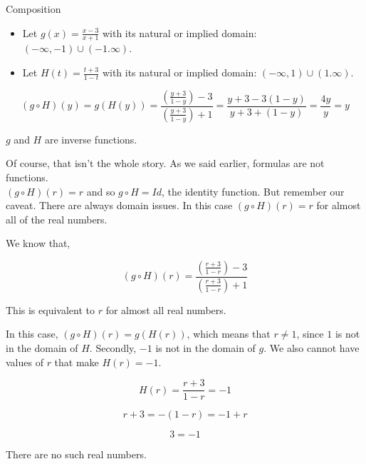 \documentclass{ximera}
\begin{document}
\begin{example} Composition



\begin{itemize}
\item Let $g(x) = \frac{x-3}{x+1}$ with its natural or implied domain: $(-\infty, -1) \cup (-1. \infty)$. \\

\item Let $H(t) = \frac{t+3}{1-t}$ with its natural or implied domain: $(-\infty, 1) \cup (1. \infty)$.
\end{itemize}



\[
(g \circ H)(y) = g(H(y)) = \frac{\left( \frac{y+3}{1-y} \right) - 3}{\left(  \frac{y+3}{1-y}\right) + 1} = \frac{y+3-3(1-y)}{y+3+(1-y)} = \frac{4y}{y} = y
\]



$g$ and $H$ are inverse functions.




\end{example}

Of course, that isn't the whole story.  As we said earlier, formulas are not functions. \\

$(g \circ H)(r) = r$ and so $g \circ H = Id$, the identity function.  But remember our caveat.  There are always domain issues.  In this case $(g \circ H)(r) = r$ for almost all of the real numbers.

We know that, 


\[
(g \circ H)(r) = \frac{\left( \frac{r+3}{1-r} \right) - 3}{\left(  \frac{r+3}{1-r}\right) + 1} 
\]


This is equivalent to $r$ for almost all real numbers.


In this case, $(g \circ H)(r) = g(H(r))$, which means that $r \ne 1$, since $1$ is not in the domain of $H$.  Secondly, $-1$ is not in the domain of $g$.  We also cannot have values of $r$ that make $H(r) = -1$.




\[
H(r) = \frac{r+3}{1-r} = -1
\]

\[
r + 3 = -(1-r) = -1 + r
\]


\[
3 = -1
\]


There are no such real numbers.
\end{document}
